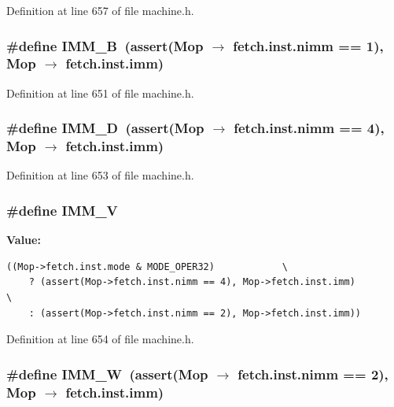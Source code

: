 Definition at line 657 of file machine.h.
\subsubsection[{IMM\_\-B}]{\setlength{\rightskip}{0pt plus 5cm}\#define IMM\_\-B~(assert(Mop $\rightarrow$ fetch.inst.nimm == 1), Mop $\rightarrow$ fetch.inst.imm)}\label{machine_8h_6e887b613a8b61900743d43c3e068ecf}




Definition at line 651 of file machine.h.
\subsubsection[{IMM\_\-D}]{\setlength{\rightskip}{0pt plus 5cm}\#define IMM\_\-D~(assert(Mop $\rightarrow$ fetch.inst.nimm == 4), Mop $\rightarrow$ fetch.inst.imm)}\label{machine_8h_185eeac87623ed593f29d58f6d78e082}




Definition at line 653 of file machine.h.
\subsubsection[{IMM\_\-V}]{\setlength{\rightskip}{0pt plus 5cm}\#define IMM\_\-V}\label{machine_8h_829b43aa25540c9472a71dbf26d007e8}


\textbf{Value:}

\begin{Code}\begin{verbatim}((Mop->fetch.inst.mode & MODE_OPER32)            \
    ? (assert(Mop->fetch.inst.nimm == 4), Mop->fetch.inst.imm)        \
    : (assert(Mop->fetch.inst.nimm == 2), Mop->fetch.inst.imm))
\end{verbatim}
\end{Code}


Definition at line 654 of file machine.h.
\subsubsection[{IMM\_\-W}]{\setlength{\rightskip}{0pt plus 5cm}\#define IMM\_\-W~(assert(Mop $\rightarrow$ fetch.inst.nimm == 2), Mop $\rightarrow$ fetch.inst.imm)}\label{machine_8h_d8a71b7590d6f0f22678a7618829f842}




